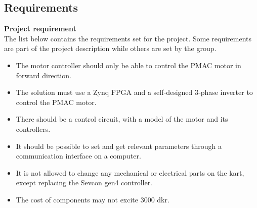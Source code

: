 
\subsection{Requirements}

\textbf{Project requirement} \\
The list below contains the requirements set for the project. Some requirements are part of the project description \cite{Project 1. semester - S19} while others are set by the group.

\begin{itemize}
\item The motor controller should only be able to control the PMAC motor in forward direction.

\item The solution must use a Zynq FPGA and a self‐designed 3‐phase inverter to control the PMAC motor.

\item There should be a control circuit, with a model of the motor and its controllers.

\item It should be possible to set and get relevant parameters through a communication interface on a computer. 

\item It is not allowed to change any mechanical or electrical parts on the kart, except replacing the Sevcon gen4 controller. 

\item The cost of components may not excite 3000 dkr.

\end{itemize}